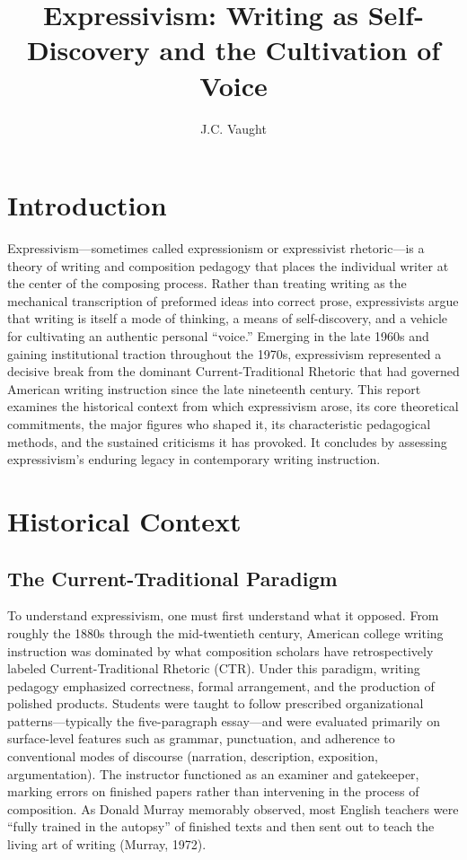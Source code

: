 \documentclass[12pt]{article}
\title{Expressivism: Writing as Self-Discovery and the Cultivation of Voice}
\author{J.C. Vaught}
\date{}
\begin{document}
\maketitle

\section{Introduction}

Expressivism---sometimes called expressionism or expressivist rhetoric---is a theory of writing and composition pedagogy that places the individual writer at the center of the composing process. Rather than treating writing as the mechanical transcription of preformed ideas into correct prose, expressivists argue that writing is itself a mode of thinking, a means of self-discovery, and a vehicle for cultivating an authentic personal ``voice.'' Emerging in the late 1960s and gaining institutional traction throughout the 1970s, expressivism represented a decisive break from the dominant Current-Traditional Rhetoric that had governed American writing instruction since the late nineteenth century. This report examines the historical context from which expressivism arose, its core theoretical commitments, the major figures who shaped it, its characteristic pedagogical methods, and the sustained criticisms it has provoked. It concludes by assessing expressivism's enduring legacy in contemporary writing instruction.

\section{Historical Context}

\subsection{The Current-Traditional Paradigm}

To understand expressivism, one must first understand what it opposed. From roughly the 1880s through the mid-twentieth century, American college writing instruction was dominated by what composition scholars have retrospectively labeled Current-Traditional Rhetoric (CTR). Under this paradigm, writing pedagogy emphasized correctness, formal arrangement, and the production of polished products. Students were taught to follow prescribed organizational patterns---typically the five-paragraph essay---and were evaluated primarily on surface-level features such as grammar, punctuation, and adherence to conventional modes of discourse (narration, description, exposition, argumentation). The instructor functioned as an examiner and gatekeeper, marking errors on finished papers rather than intervening in the process of composition. As Donald Murray memorably observed, most English teachers were ``fully trained in the autopsy'' of finished texts and then sent out to teach the living art of writing (Murray, 1972).
\end{document}
